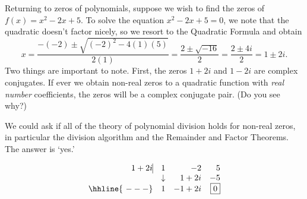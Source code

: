 \documentclass{ximera}
\begin{document}

Returning to zeros of polynomials, suppose we wish to find the zeros of $f(x) = x^2-2x+5$.  To solve the equation $x^2-2x+5 = 0$, we note that the quadratic doesn't factor nicely, so we resort to the Quadratic Formula %
and obtain 
\[ 
    x = \dfrac{-(-2) \pm \sqrt{(-2)^2-4(1)(5)}}{2(1)} = \dfrac{2 \pm \sqrt{-16}}{2} = \dfrac{2 \pm 4i}{2} = 1 \pm 2i.
\] 
Two things are important to note.  First, the zeros $1+2i$ and $1-2i$ are complex conjugates.  If ever we obtain non-real zeros to a quadratic function with \textit{real number} coefficients, the zeros  will be a complex conjugate pair. (Do you see why?)  

We could ask if all of the theory of polynomial division %
holds for non-real zeros, in particular the division algorithm and the Remainder and Factor Theorems.  The answer is `yes.'  

\[
    \begin{array}{rrrr}
        1+2i   \vline & 1 & -2 & 5 \\
        & \downarrow   &  1+2i  &  -5 \\ \hhline{~---} 
        & 1 & -1+2i &  \fbox{$0$}   \\
    \end{array}
\]
\end{document}
